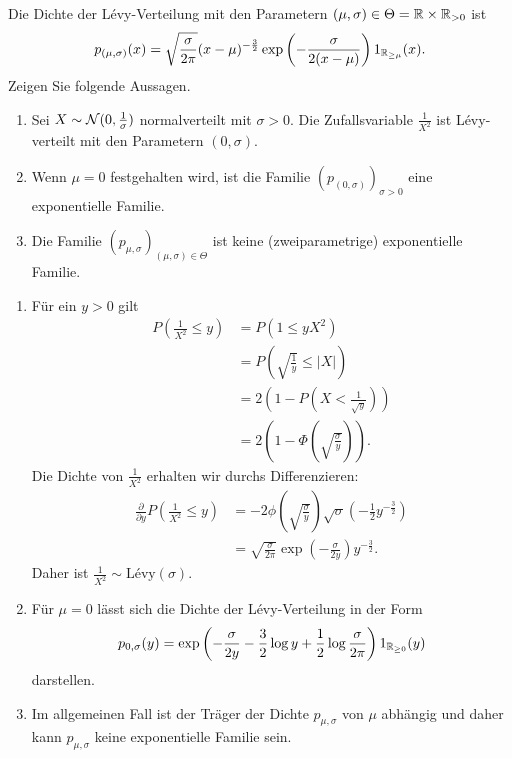  Die Dichte der L\'evy-Verteilung mit den
Parametern $(\mu,\sigma)\in \Theta = \mathbb R \times \mathbb R_{>0}$ ist
\begin{equation*}
    p_{(\mu, \sigma)}(x) = \sqrt{ \frac{\sigma}{2\pi}} (x-\mu)^{-\frac{3}{2}} 
    \exp\left( -\frac{\sigma}{2(x-\mu)} \right) 1_{\mathbb R_{\geq \mu}} (x).
\end{equation*}
Zeigen Sie folgende Aussagen.
\begin{enumerate}
    \item Sei $X\sim \mathcal N (0, \frac{1}{\sigma})$ normalverteilt mit $\sigma>0$.
        Die Zufallsvariable $\frac{1}{X^2}$ ist L\'evy-verteilt mit den Parametern
        $(0,\sigma)$.
    \item Wenn $\mu=0$ festgehalten wird, ist die Familie $(p_{(0,\sigma)})_{\sigma>0}$
        eine exponentielle Familie. 
    \item Die Familie $(p_{\mu,\sigma})_{(\mu,\sigma)\in\Theta}$ ist keine
        (zweiparametrige) exponentielle Familie. 
\end{enumerate}

\solution 
\begin{enumerate}
    \item Für ein $y>0$ gilt
        \begin{align*}
            P \left( \frac{1}{X^{2}} \leq y \right) &= P \left( 1 \leq y X^{2}   \right) \\
            &= P \left( \sqrt{\frac{1}{y}} \leq | X | \right) \\
            &= 2 \left( 1 - P \left( X < \frac{1}{\sqrt{y}} \right) \right) \\
            &= 2 \left( 1 - \Phi\left( \sqrt{ \frac{\sigma}{y}} \right) \right).
        \end{align*}
        Die Dichte von $\frac{1}{X^2}$ erhalten wir durchs Differenzieren:
        \begin{align*}
            \frac{\partial}{\partial y} P \left( \frac{1}{X^2} \leq y \right) &=
            -2 \phi \left( \sqrt{\frac{\sigma}{y}} \right) \sqrt{\sigma} 
            \left( -\frac{1}{2} y^{-\frac{3}{2}} \right) \\
            &= \sqrt{\frac{\sigma}{2 \pi}} \exp \left( - \frac{\sigma}{2 y} \right) y^{-\frac{3}{2}}.
        \end{align*}
        Daher ist $\frac{1}{X^2} \sim \text{L\'evy}(\sigma)$.

    \item Für $\mu=0$ lässt sich die Dichte der L\'evy-Verteilung in der Form
        \begin{equation*}
            p_{0,\sigma}(y) = \exp \left( -\frac{\sigma}{2y} - \frac{3}{2}\log y 
            + \frac{1}{2} \log \frac{\sigma}{2 \pi}  \right) 1_{\mathbb R_{\geq 0}} (y)
        \end{equation*}
        darstellen.

    \item Im allgemeinen Fall ist der Träger der Dichte $p_{\mu,\sigma}$ von $\mu$ abhängig und daher
        kann $p_{\mu,\sigma}$ keine exponentielle Familie sein.

\end{enumerate}






